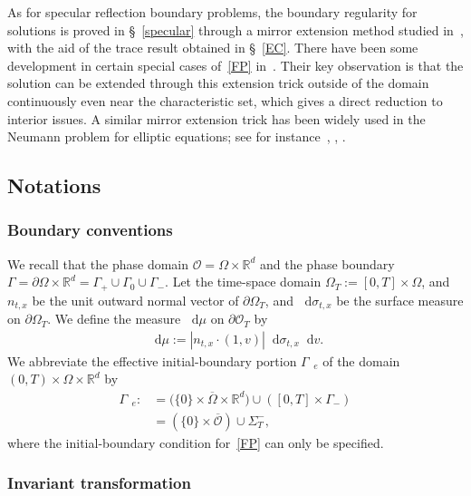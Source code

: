\documentclass[AHL,Unicode,longabstracts,published]{cedram}
\newcommand*{\dif}{\mathop{}\!\mathrm{d}}
\newcommand*\p{\partial}
\newcommand*\R {\mathbb{R}}
\newcommand*\Ge {\Gamma_{\;\!\!\;\!\!e}}
\newcommand*\OO {\mathcal{O}}
\begin{document}
As for specular reflection boundary problems, the boundary regularity for solutions is proved in \S~\ref{specular} through a mirror extension method studied in~\cite{GHJO,Nier}, with the aid of the trace result obtained in \S~\ref{EC}. There have been some development in certain special cases of~\eqref{FP} in~\cite{DGY,GHJO}. Their key observation is that the solution can be extended through this extension trick outside of the domain continuously even near the characteristic set, which gives a direct reduction to interior issues. A similar mirror extension trick has been widely used in the Neumann problem for elliptic equations; see for instance~\cite[Section~2.4.3]{Tro}, \cite[Proof of Theorem~2.5]{DK}, \cite[Section~9.1.8]{Nier}.

\subsection{Notations}
\subsubsection{Boundary conventions} 

We recall that the phase domain $\OO=\Omega\times\R^d$ and the phase boundary $\Gamma=\p\Omega\times\R^d=\Gamma_+\cup\Gamma_0\cup\Gamma_-$. Let the time-space domain $\Omega_T:=[0,T]\times\Omega$, and $n_{t,x}$ be the unit outward normal vector of $\p\Omega_T$, and $\dif\sigma_{t,x}$ be the surface measure on $\p\Omega_T$. We define the measure $\dif\mu$ on $\p\OO_T$ by
\begin{align*}
\dif\mu:=\left|n_{t,x}\cdot (1,v)\right|\dif\sigma_{t,x}\dif v.
\end{align*}
We abbreviate the effective initial-boundary portion $\Ge$ of the domain $(0,T)\times\Omega\times\R^d$ by
\begin{align*}
\Ge:&=\big(\{0\}\times\overline{\Omega}\times\R^d\big)
\cup\left([0,T]\times\Gamma_-\right)\\ &=\left(\{0\}\times\overline{\OO}\right)\cup\Sigma_T^-,
\end{align*}
where the initial-boundary condition for~\eqref{FP} can only be specified.

\subsubsection{Invariant transformation}\label{invariant}
\end{document}
